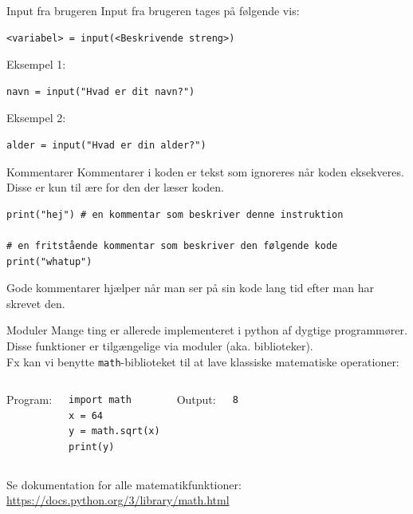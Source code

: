 \documentclass{beamer}
\begin{document}
\begin{frame}[fragile]{Input fra brugeren}
Input fra brugeren tages på følgende vis:
\begin{lstlisting}[style=python]
<variabel> = input(<Beskrivende streng>)
\end{lstlisting}
Eksempel 1:
\begin{lstlisting}[style=python]
navn = input("Hvad er dit navn?")
\end{lstlisting}
Eksempel 2:
\begin{lstlisting}[style=python]
alder = input("Hvad er din alder?")
\end{lstlisting}
\end{frame}

\begin{frame}[fragile]{Kommentarer}
Kommentarer i koden er tekst som ignoreres når koden eksekveres. Disse er kun til ære for den der læser koden.
\begin{lstlisting}[style=python]
print("hej") # en kommentar som beskriver denne instruktion

# en fritstående kommentar som beskriver den følgende kode
print("whatup")
\end{lstlisting}
Gode kommentarer hjælper når man ser på sin kode lang tid efter man har skrevet den.
\end{frame}

\begin{frame}[fragile]{Moduler}
Mange ting er allerede implementeret i python af dygtige programmører.
Disse funktioner er tilgængelige via moduler (aka. biblioteker). \\
Fx kan vi benytte \texttt{math}-biblioteket til at lave klassiske matematiske operationer:

\bigskip
\begin{columns}
Program:
\begin{lstlisting}[style=python]
import math
x = 64
y = math.sqrt(x)
print(y)
\end{lstlisting}
Output:
\begin{lstlisting}[style=python]
8
\end{lstlisting}
\end{columns}


Se dokumentation for alle matematikfunktioner:
\url{https://docs.python.org/3/library/math.html}
\end{frame}
\end{document}
